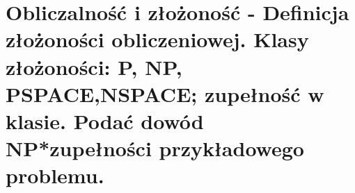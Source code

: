 \section{Obliczalność i złożoność - Definicja złożoności obliczeniowej. Klasy złożoności: P, NP, PSPACE,NSPACE; zupełność w klasie. Podać dowód NP*zupełności przykładowego problemu.}
